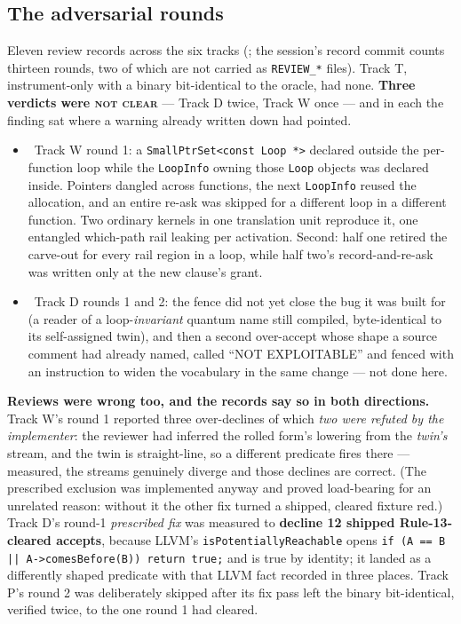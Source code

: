 \subsection*{The adversarial rounds}
Eleven review records across the six tracks (; the
session's record commit counts thirteen rounds, two of which are not carried as \texttt{REVIEW\_*} files).
Track T, instrument-only with a binary bit-identical to the oracle, had none. \textbf{Three verdicts were
\textsc{not clear}} --- Track D twice, Track W once --- and in each the finding sat where a warning already
written down had pointed.
\begin{itemize}
  \item \fconfirmed\ Track W round 1: a \texttt{SmallPtrSet<const Loop *>} declared outside the per-function
    loop while the \texttt{LoopInfo} owning those \texttt{Loop} objects was declared inside. Pointers dangled
    across functions, the next \texttt{LoopInfo} reused the allocation, and an entire re-ask was skipped for
    a different loop in a different function. Two ordinary kernels in one translation unit reproduce it, one
    entangled which-path rail leaking per activation. Second: half one retired the carve-out for every rail
    region in a loop, while half two's record-and-re-ask was written only at the new clause's grant.
  \item \fconfirmed\ Track D rounds 1 and 2: the fence did not yet close the bug it was built for (a reader
    of a loop-\emph{invariant} quantum name still compiled, byte-identical to its self-assigned twin), and
    then a second over-accept whose shape a source comment had already named, called ``NOT EXPLOITABLE''
    and fenced with an instruction to widen the vocabulary in the same change --- not done here.
\end{itemize}
\textbf{Reviews were wrong too, and the records say so in both directions.} Track W's round 1 reported three
over-declines of which \emph{two were refuted by the implementer}: the reviewer had inferred the rolled
form's lowering from the \emph{twin's} stream, and the twin is straight-line, so a different predicate fires
there --- measured, the streams genuinely diverge and those declines are correct. (The prescribed exclusion was implemented anyway and proved
load-bearing for an unrelated reason: without it the other fix turned a shipped, cleared fixture red.)
Track D's round-1 \emph{prescribed fix} was measured to
\textbf{decline 12 shipped Rule-13-cleared accepts}, because LLVM's \texttt{isPotentiallyReachable} opens
\texttt{if (A == B || A->comesBefore(B)) return true;} and is true by identity; it landed as a differently
shaped predicate with that LLVM fact recorded in three places. Track P's round 2 was deliberately skipped
after its fix pass left the binary bit-identical, verified twice, to the one round 1 had cleared.

